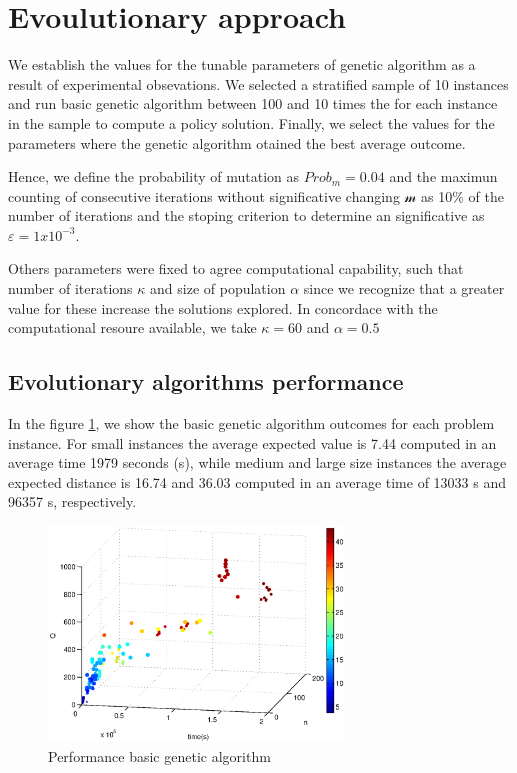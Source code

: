 \section{Evoulutionary approach}

We establish the values for the tunable parameters of genetic algorithm as a result of experimental obsevations. We selected a stratified sample of 10 instances and run basic genetic algorithm between 100 and 10 times the for each instance in the sample to compute a policy solution. Finally, we select the values for the parameters where the genetic algorithm otained the best average outcome.

Hence, we define the probability of mutation as $Prob_m = 0.04$ and the maximun counting of consecutive iterations without significative changing $\mathcal{m}$ as 10\% of the number of iterations and the stoping criterion to determine an significative as $\varepsilon = 1x10^{-3}$.

Others parameters were fixed to agree computational capability, such that  number of iterations $\kappa$ and size of population $\alpha$ since we recognize that a greater value for these increase the solutions explored. In concordace with the computational resoure available, we take $\kappa = 60$ and $\alpha = 0.5$

\subsection{Evolutionary algorithms performance}

In the figure \ref{fig:compare_expected_distance_ga}, we show the basic genetic algorithm outcomes for each problem instance.  For small instances the average expected value is 7.44 computed in an average time 1979 seconds (s), while medium and large size instances the average expected distance is 16.74 and 36.03 computed in an average time of 13033 s and 96357 s, respectively.


\begin{figure}[!htbp]
  \begin{center}
   \includegraphics[width=0.7\textwidth]{Images/Chapter5/compare_expected_distance_ga.eps}
  \end{center}
    \caption{Performance basic genetic algorithm}\label{fig:compare_expected_distance_ga}
\end{figure}



